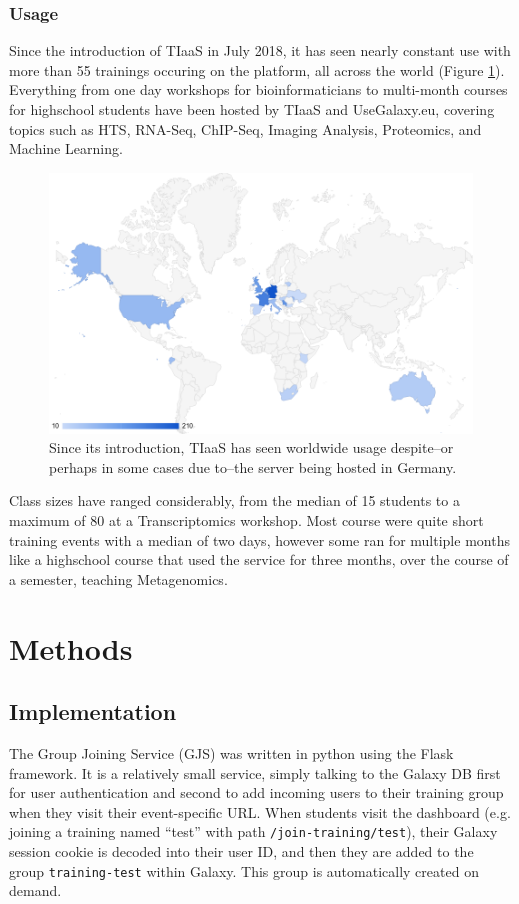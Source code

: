 \documentclass[a4paper,num-refs]{oup-contemporary}
\begin{document}
\subsubsection{Usage}
Since the introduction of TIaaS in July 2018, it has seen nearly constant use with more than 55 trainings occuring on the platform, all across the world (Figure \ref{figure:map}). Everything from one day workshops for bioinformaticians to multi-month courses for highschool students have been hosted by TIaaS and UseGalaxy.eu, covering topics such as HTS, RNA-Seq, ChIP-Seq, Imaging Analysis, Proteomics, and Machine Learning.

\begin{figure}[bt!]
\centering
\includegraphics[width=\linewidth]{images/map.png}
	\caption{Since its introduction, TIaaS has seen worldwide usage despite--or perhaps in some cases due to--the server being hosted in Germany.}\label{figure:map}
\end{figure}

Class sizes have ranged considerably, from the median of 15 students to a maximum of 80 at a Transcriptomics workshop. Most course were quite short training events with a median of two days, however some ran for multiple months like a highschool course that used the service for three months, over the course of a semester, teaching Metagenomics.

\section{Methods}

\subsection{Implementation}
The Group Joining Service (GJS) was written in python using the Flask framework. It is a relatively small service, simply talking to the Galaxy DB first for user authentication and second to add incoming users to their training group when they visit their event-specific URL. When students visit the dashboard (e.g. joining a training named ``test'' with path \texttt{/join-training/test}), their Galaxy session cookie is decoded into their user ID, and then they are added to the group \texttt{training-test} within Galaxy. This group is automatically created on demand.
\end{document}

